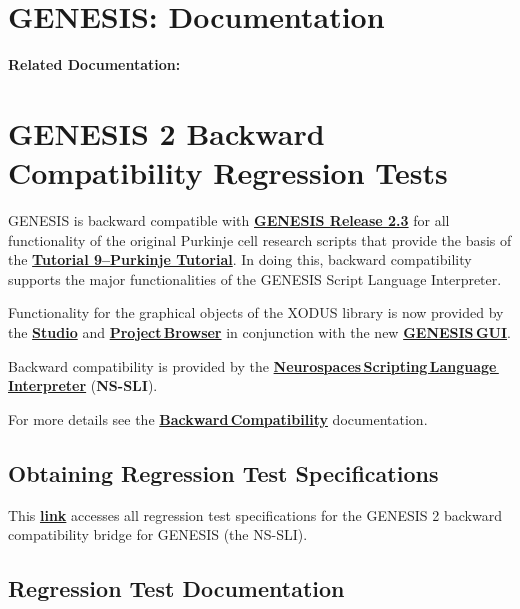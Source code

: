 \documentclass[12pt]{article}
\begin{document}
\section*{GENESIS: Documentation}

{\bf Related Documentation:}

\section*{GENESIS 2 Backward Compatibility Regression Tests}

GENESIS is backward compatible with \href{http://genesis-sim.org/GENESIS/genesis-ftp/}{\bf GENESIS Release 2.3} for all functionality of the original Purkinje cell research scripts that provide the basis of the \href{http://genesis-sim.org/GENESIS/illtuts/purkinje.html}{\bf Tutorial 9--Purkinje Tutorial}. In doing this, backward compatibility supports the major functionalities of the GENESIS Script Language Interpreter.

Functionality for the graphical objects of the XODUS library is now provided by the \href{../studio/studio.tex}{\bf Studio} and \href{../project-browser/project-browser.tex}{\bf Project\,Browser} in conjunction with the new \href{../gui/gui.tex}{\bf GENESIS\,GUI}.

Backward compatibility is provided by the \href{../nssli/nssli.tex}{\bf Neurospaces\,Scripting\,Language\,Interpreter} ({\bf NS-SLI}).

For more details see the \href{../backward-compatibility/backward-compatibility.tex}{\bf Backward\,Compatibility} documentation.

\subsection*{Obtaining Regression Test Specifications}

This \href{http://www.neurospaces.org/neurospaces_project/ns-sli/tests/html/index.html}{\bf link} accesses all regression test specifications for the GENESIS 2 backward compatibility bridge for GENESIS (the NS-SLI).

\subsection*{Regression Test Documentation}
\end{document}
